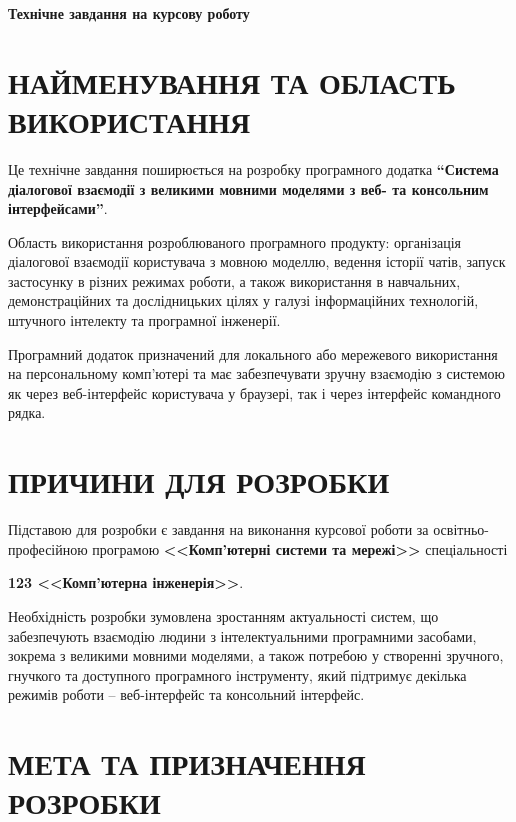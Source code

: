 \documentclass[12pt,a4paper]{article}
\begin{document}
    \begin{center} \textbf{\Large Технічне завдання на курсову роботу} \end{center}

    \vspace{0.5cm}

    \tableofcontents

    \newpage

    \section{НАЙМЕНУВАННЯ ТА ОБЛАСТЬ ВИКОРИСТАННЯ}

    Це технічне завдання поширюється на розробку програмного додатка
    \textbf{``Система діалогової взаємодії з великими мовними моделями з веб- та консольним інтерфейсами''}.

    Область використання розроблюваного програмного продукту:
    організація діалогової взаємодії користувача з мовною моделлю,
    ведення історії чатів, запуск застосунку в різних режимах роботи,
    а також використання в навчальних, демонстраційних та дослідницьких цілях
    у галузі інформаційних технологій, штучного інтелекту та програмної інженерії.

    Програмний додаток призначений для локального або мережевого використання
    на персональному комп'ютері та має забезпечувати зручну взаємодію з системою
    як через веб-інтерфейс користувача у браузері, так і через інтерфейс командного рядка.

    \section{ПРИЧИНИ ДЛЯ РОЗРОБКИ}

    Підставою для розробки є завдання на виконання курсової роботи
    за освітньо-професійною програмою
    \textbf{<<Комп'ютерні системи та мережі>>}
    спеціальності

    \noindent
    \textbf{123 <<Комп'ютерна інженерія>>}.

    Необхідність розробки зумовлена зростанням актуальності систем,
    що забезпечують взаємодію людини з інтелектуальними програмними засобами,
    зокрема з великими мовними моделями, а також потребою у створенні
    зручного, гнучкого та доступного програмного інструменту,
    який підтримує декілька режимів роботи -- веб-інтерфейс та консольний інтерфейс.

    \section{МЕТА ТА ПРИЗНАЧЕННЯ РОЗРОБКИ}
\end{document}
